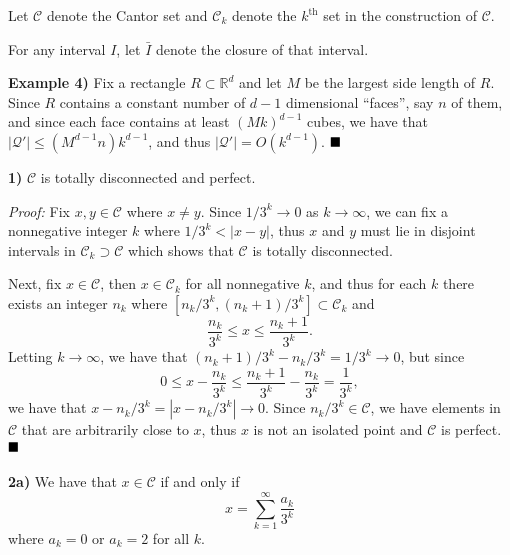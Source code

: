 \documentclass[12pt]{article}
\newcommand{\R}{\ensuremath{\mathbb{R}}}
\newcommand{\vertb}   [1]{\ensuremath{\left\vert#1\right\vert}}
\newcommand{\mc}[1]{\ensuremath{\mathcal{#1}}}
\newcommand{\done} {\ensuremath{\strut\hfill\blacksquare}}
\newcommand{\proof}{\textit{Proof: }}
\begin{document}
\pagestyle{fancy}

\setlength{\parindent}{0in}
\setlength{\parskip}{0.1in}

Let \( \mc{C} \) denote the Cantor set and \( \mc{C}_k \) denote the
\( k^\text{th} \) set in the construction of \( \mc{C} \).

For any interval \( I \), let \( \bar{I} \) denote the closure of that
interval.

\textbf{Example 4)}
Fix a rectangle \( R \subset \R^d \) and let \( M \) be the largest side length
of \( R \).
Since \( R \) contains a constant number of \( d - 1 \) dimensional ``faces'',
say \( n \) of them, and since each face contains at least \( (Mk)^{d - 1} \)
cubes, we have that \( \vertb{\mc{Q}'} \leq (M^{d - 1}n)k^{d - 1} \), and thus
\( \vertb{\mc{Q}'} = O(k^{d - 1}) \).
\done

\textbf{1)}
\( \mc{C} \) is totally disconnected and perfect.

\proof
Fix \( x, y \in \mc{C} \) where \( x \ne y \).
Since \( 1 / 3^k \to 0 \) as \( k \to \infty \), we can fix a nonnegative
integer \( k \) where \( 1 / 3^k < \vertb{x - y} \), thus \( x \) and \( y \)
must lie in disjoint intervals in \( \mc{C}_k \supset \mc{C} \) which
shows that \( \mc{C} \) is totally disconnected.

Next, fix \( x \in \mc{C} \), then \( x \in \mc{C}_k \) for all nonnegative
\( k \), and thus for each \( k \) there exists an integer \( n_k \) where
\( [n_k / 3^k, (n_k + 1) / 3^k] \subset \mc{C}_k \) and
\[
	\frac{n_k}{3^k} \leq x \leq \frac{n_k + 1}{3^k}.
\]
Letting \( k \to \infty \), we have that
\( (n_k + 1) / 3^k - n_k / 3^k = 1 / 3^k \to 0 \), but since
\[
	0
	\leq x - \frac{n_k}{3^k}
	\leq \frac{n_k + 1}{3^k} - \frac{n_k}{3^k}
	= \frac{1}{3^k},
\]
we have that \( x - n_k / 3^k = \vertb{x - n_k / 3^k} \to 0 \).
Since \( n_k / 3^k \in \mc{C} \), we have elements in \( \mc{C} \) that are
arbitrarily close to \( x \), thus \( x \) is not an isolated point and
\( \mc{C} \) is perfect.
\done

\textbf{2a)} We have that \( x \in \mc{C} \) if and only if
\[
	x = \sum_{k = 1}^\infty \frac{a_k}{3^k}
\]
where \( a_k = 0 \) or \( a_k = 2 \) for all \( k \).
\end{document}
